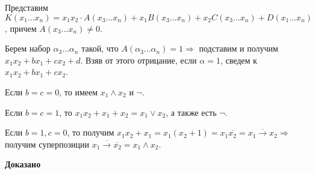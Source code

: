 \documentclass[a4paper,12pt]{article} %
\begin{document}
Представим $K(x_1...x_n) = x_1x_2\cdot A(x_3...x_n) + x_1B(x_3...x_n) + x_2C(x_3...x_n) + D(x_1...x_n)$, причем $A(x_3...x_n) \neq 0.$

Берем набор $\alpha_3...\alpha_n$ такой, что $A(\alpha_3...\alpha_n) = 1 \Rightarrow$ подставим и получим $x_1x_2 + bx_1 + cx_2 + d$. Взяв от этого отрицание, если $\alpha = 1$, сведем к $x_1x_2 + bx_1 + cx_2$.

Если $b = c =0$, то имеем $x_1\wedge x_2$ и $\neg$.

Если $b = c =1$, то $x_1x_2 + x_1 + x_2 = x_1 \vee x_2$, а также есть $\neg$.

Если $b = 1, c = 0$, то получим $x_1x_2 + x_1 = x_1(x_2 + 1) = x_1\overline{x_2} = \overline{x_1\rightarrow x_2} \Rightarrow$ получим суперпозиции $\overline{x_1 \rightarrow \overline{x_2}} = x_1 \wedge x_2.$

\begin{flushright}
\begin{large}
\textbf {Доказано}
\end{large}
\end{flushright}
\end{document}
